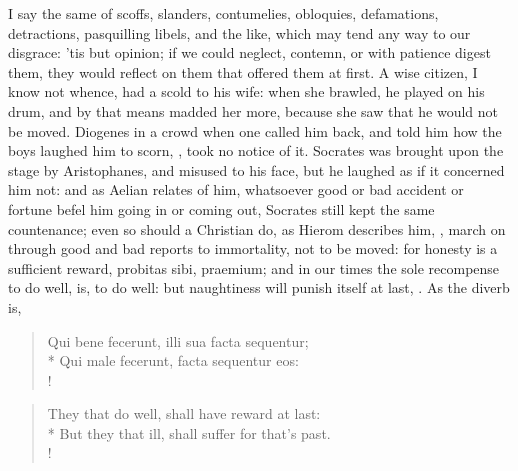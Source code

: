 {I say the same of scoffs, slanders, contumelies, obloquies, defamations, detractions, pasquilling libels, and the like, which may tend any way to our disgrace: 'tis but opinion; if we could neglect, contemn, or with patience digest them, they would reflect on them that offered them at first. A wise citizen, I know not whence, had a scold to his wife: when she brawled, he played on his drum, and by that means madded her more, because she saw that he would not be moved. Diogenes in a crowd when one called him back, and told him how the boys laughed him to scorn, , took no notice of it. Socrates was brought upon the stage by Aristophanes, and misused to his face, but he laughed as if it concerned him not: and as Aelian relates of him, whatsoever good or bad accident or fortune befel him going in or coming out, Socrates still kept the same countenance; even so should a Christian do, as Hierom describes him, , march on through good and bad reports to immortality, not to be moved: for honesty is a sufficient reward, probitas sibi, praemium; and in our times the sole recompense to do well, is, to do well: but naughtiness will punish itself at last, . As the diverb is,

\begin{latin}%
\begin{verse}%
Qui bene fecerunt, illi sua facta sequentur;\\*
Qui male fecerunt, facta sequentur eos:\\!
\end{verse}%
\end{latin}%
\translationrule%
\begin{verse}%
They that do well, shall have reward at last:\\*
But they that ill, shall suffer for that's past.\\!
\end{verse}%

}
